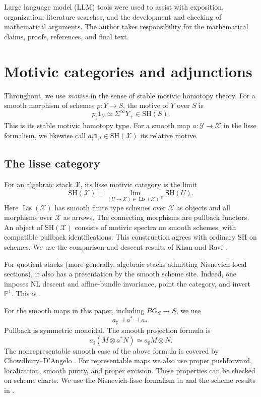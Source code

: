 \documentclass[11pt,reqno]{amsart}
\theoremstyle{definition}
\theoremstyle{remark}
\theoremstyle{plain}
\numberwithin{equation}{section}
\newcommand{\SH}{\mathrm{SH}}
\newcommand{\one}{\mathbf 1}
\newcommand{\Pj}{\mathbb P}
\DeclareMathOperator*{\limm}{lim}
\newcommand{\X}{\mathcal X}
\newcommand{\Y}{\mathcal Y}
\begin{document}
Large language model (LLM) tools were used to assist with exposition,
organization, literature searches, and the development and checking
of mathematical arguments.
The author takes responsibility for the mathematical claims, proofs,
references, and final text.


\section{Motivic categories and adjunctions}\label{sec:formalism}

Throughout, we use \emph{motive} in the sense of stable motivic
homotopy theory. For a smooth morphism of schemes \(p:Y\to S\),
the motive of \(Y\) over \(S\) is
\[
 p_\sharp\one_Y\simeq\Sigma^\infty Y_+\in\SH(S).
\]
This is its stable motivic homotopy type.
For a smooth map \(a:\Y\to\X\) in the lisse formalism, we
likewise call \(a_\sharp\one_\Y\in\SH(\X)\) its relative
motive.


\subsection{The lisse category}
For an algebraic stack \(\X\), its lisse motivic category is the limit
\begin{equation}\label{eq:lisse}
 \SH(\X)=
\limm_{(U\to\X)\in\operatorname{Lis}(\X)^{\mathrm{op}}}\SH(U).
\end{equation}
Here \(\operatorname{Lis}(\X)\) has smooth finite type schemes over \(\X\) as objects
 and all morphisms over \(\X\) as arrows.
The connecting morphisms are pullback functors.
An object of \(\SH(\X)\) consists of motivic spectra on smooth schemes, 
with compatible pullback identifications.
This construction agrees with ordinary \(\SH\) on schemes.
We use the comparison and descent results of Khan and Ravi
\cite[Section~1 and Lemma~1.5]{KhanRavi}.

For quotient stacks (more generally, algebraic stacks admitting Nisnevich-local sections),
it also has a presentation by the smooth scheme site.
Indeed, one imposes NL descent and affine-bundle invariance, point the category, and invert \(\Pj^1\).
This is \cite[Theorem~3.21]{ChowdhuryDAngelo}.

For the smooth maps in this paper, including \(BG_S\to S\), we use
\begin{equation}\label{eq:smooth-adjoints}
 a_\sharp\dashv a^*\dashv a_*.
\end{equation}
Pullback is symmetric monoidal.
The smooth projection formula is
\begin{equation}\label{eq:smooth-projection}
 a_\sharp(M\otimes a^*N)\simeq a_\sharp M\otimes N.
\end{equation}
The nonrepresentable smooth case of the above formula is covered by Chowdhury--D'Angelo
\cite[Theorem~4.26]{ChowdhuryDAngelo}.
For representable maps we also use proper pushforward, localization, smooth purity, and proper excision.
These properties can be checked on scheme charts.
We use the Nisnevich-lisse formalism in \cite[Corollary~7.2.4]{KhanLisse} and
the scheme results in \cite[Theorems~2.35, 2.45, and 2.48]{Khan}.
\end{document}
